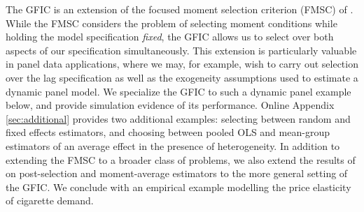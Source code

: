 The GFIC is an extension of the focused moment selection criterion (FMSC) of \cite{DiTraglia2016}.
While the FMSC considers the problem of selecting moment conditions while holding the model specification \emph{fixed}, the GFIC allows us to select over both aspects of our specification simultaneously.
This extension is particularly valuable in panel data applications, where we may, for example, wish to carry out selection over the lag specification as well as the exogeneity assumptions used to estimate a dynamic panel model.
We specialize the GFIC to such a dynamic panel example below, and provide simulation evidence of its performance.
Online Appendix \ref{sec:additional} provides two additional examples: selecting between random and fixed effects estimators, and choosing between pooled OLS and mean-group estimators of an average effect in the presence of heterogeneity.  
In addition to extending the FMSC to a broader class of problems, we also extend the results of \cite{DiTraglia2016} on post-selection and moment-average estimators to the more general setting of the GFIC.  
We conclude with an empirical example modelling the price elasticity of cigarette demand. 

